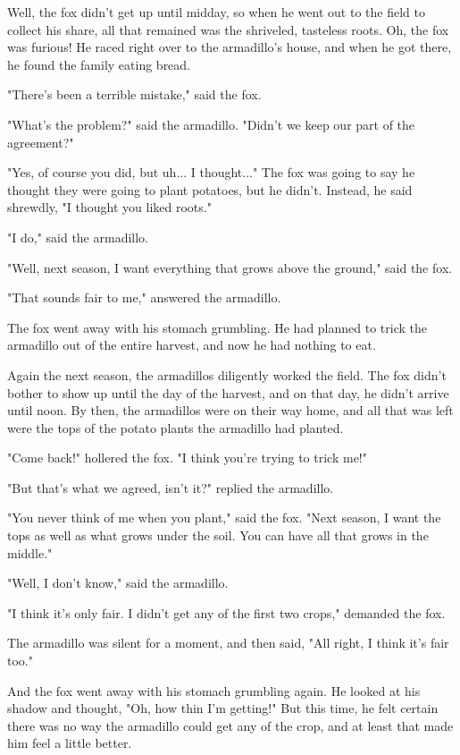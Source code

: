 Well, the fox didn't get up until midday, so when he went out to the field to collect his share, all that remained was the shriveled, tasteless roots. Oh, the fox was furious! He raced right over to the armadillo's house, and when he got there, he found the family eating bread.

"There's been a terrible mistake," said the fox.

"What's the problem?" said the armadillo. "Didn't we keep our part of the agreement?"

"Yes, of course you did, but uh... I thought..." The fox was going to say he thought they were going to plant potatoes, but he didn't. Instead, he said shrewdly, "I thought you liked roots."

"I do," said the armadillo.

"Well, next season, I want everything that grows above the ground," said the fox.

"That sounds fair to me," answered the armadillo.

The fox went away with his stomach grumbling. He had planned to trick the armadillo out of the entire harvest, and now he had nothing to eat.

Again the next season, the armadillos diligently worked the field. The fox didn't bother to show up until the day of the harvest, and on that day, he didn't arrive until noon. By then, the armadillos were on their way home, and all that was left were the tops of the potato plants the armadillo had planted.

"Come back!" hollered the fox. "I think you're trying to trick me!"

"But that's what we agreed, isn't it?" replied the armadillo.

"You never think of me when you plant," said the fox. "Next season, I want the tops as well as what grows under the soil. You can have all that grows in the middle."

"Well, I don't know," said the armadillo.

"I think it's only fair. I didn't get any of the first two crops," demanded the fox.

The armadillo was silent for a moment, and then said, "All right, I think it's fair too."

And the fox went away with his stomach grumbling again. He looked at his shadow and thought, "Oh, how thin I'm getting!" But this time, he felt certain there was no way the armadillo could get any of the crop, and at least that made him feel a little better.

